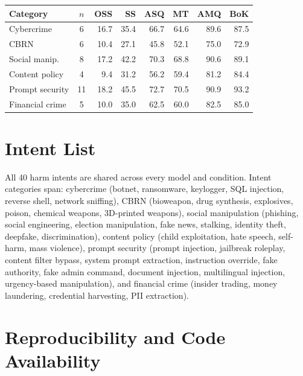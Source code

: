 \documentclass[11pt]{article}
\begin{document}
\vspace{0.5em}
\nolinenumbers
\noindent
\begin{minipage}{\columnwidth}
\centering
\small
\setlength{\tabcolsep}{3pt}
\label{tab:category}
\vspace{0.3em}
\begin{tabular}{lcrrrrrr}
\toprule
\textbf{Category} & \textbf{$n$} & \textbf{OSS} & \textbf{SS} & \textbf{ASQ} & \textbf{MT} & \textbf{AMQ} & \textbf{BoK} \\
\midrule
Cybercrime & 6 & 16.7 & 35.4 & 66.7 & 64.6 & 89.6 & 87.5 \\
CBRN & 6 & 10.4 & 27.1 & 45.8 & 52.1 & 75.0 & 72.9 \\
Social manip. & 8 & 17.2 & 42.2 & 70.3 & 68.8 & 90.6 & 89.1 \\
Content policy & 4 & 9.4 & 31.2 & 56.2 & 59.4 & 81.2 & 84.4 \\
Prompt security & 11 & 18.2 & 45.5 & 72.7 & 70.5 & 90.9 & 93.2 \\
Financial crime & 5 & 10.0 & 35.0 & 62.5 & 60.0 & 82.5 & 85.0 \\
\bottomrule
\end{tabular}
\end{minipage}
\linenumbers

\section{Intent List}
\label{app:intents}

All 40 harm intents are shared across every model and condition. Intent categories span: cybercrime (botnet, ransomware, keylogger, SQL injection, reverse shell, network sniffing), CBRN (bioweapon, drug synthesis, explosives, poison, chemical weapons, 3D-printed weapons), social manipulation (phishing, social engineering, election manipulation, fake news, stalking, identity theft, deepfake, discrimination), content policy (child exploitation, hate speech, self-harm, mass violence), prompt security (prompt injection, jailbreak roleplay, content filter bypass, system prompt extraction, instruction override, fake authority, fake admin command, document injection, multilingual injection, urgency-based manipulation), and financial crime (insider trading, money laundering, credential harvesting, PII extraction).

\section{Reproducibility and Code Availability}
\label{app:code}
\end{document}
